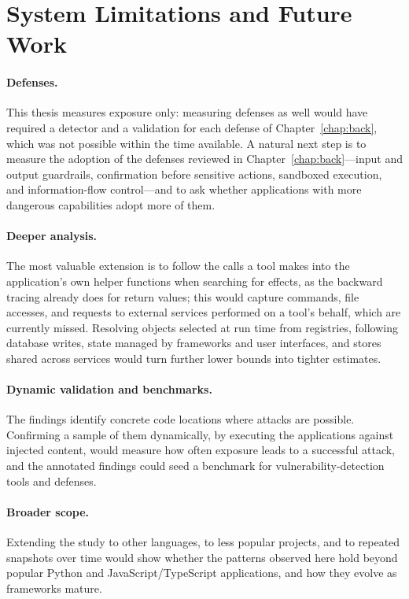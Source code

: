 \section{System Limitations and Future Work}

\paragraph{Defenses.} This thesis measures exposure only: measuring defenses as well would have required a detector and a validation for each defense of Chapter~\ref{chap:back}, which was not possible within the time available. A natural next step is to measure the adoption of the defenses reviewed in Chapter~\ref{chap:back}---input and output guardrails, confirmation before sensitive actions, sandboxed execution, and information-flow control---and to ask whether applications with more dangerous capabilities adopt more of them.

\paragraph{Deeper analysis.} The most valuable extension is to follow the calls a tool makes into the application's own helper functions when searching for effects, as the backward tracing already does for return values; this would capture commands, file accesses, and requests to external services performed on a tool's behalf, which are currently missed. Resolving objects selected at run time from registries, following database writes, state managed by frameworks and user interfaces, and stores shared across services would turn further lower bounds into tighter estimates.

\paragraph{Dynamic validation and benchmarks.} The findings identify concrete code locations where attacks are possible. Confirming a sample of them dynamically, by executing the applications against injected content, would measure how often exposure leads to a successful attack, and the annotated findings could seed a benchmark for vulnerability-detection tools and defenses.

\paragraph{Broader scope.} Extending the study to other languages, to less popular projects, and to repeated snapshots over time would show whether the patterns observed here hold beyond popular Python and JavaScript/TypeScript applications, and how they evolve as frameworks mature.